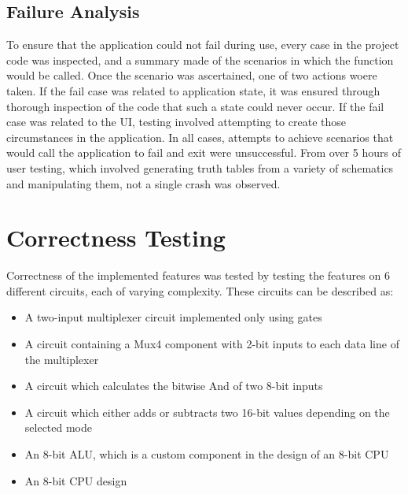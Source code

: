 \subsection{Failure Analysis}
To ensure that the application could not fail during use, every  case in the project code was inspected, and a summary made of the scenarios in which the function would be called. Once the scenario was ascertained, one of two actions woere taken. If the fail case was related to application state, it was ensured through thorough inspection of the code that such a state could never occur. If the fail case was related to the UI, testing involved attempting to create those circumstances in the application. In all cases, attempts to achieve scenarios that would call the application to fail and exit were unsuccessful. From over 5 hours of user testing, which involved generating truth tables from a variety of schematics and manipulating them, not a single crash was observed.

\section{Correctness Testing}
Correctness of the implemented features was tested by testing the features on 6 different circuits, each of varying complexity. These circuits can be described as:
\begin{itemize}
    \item A two-input multiplexer circuit implemented only using gates
    \item A circuit containing a Mux4 component with 2-bit inputs to each data line of the multiplexer
    \item A circuit which calculates the bitwise And of two 8-bit inputs
    \item A circuit which either adds or subtracts two 16-bit values depending on the selected mode
    \item An 8-bit ALU, which is a custom component in the design of an 8-bit CPU
    \item An 8-bit CPU design
\end{itemize}

